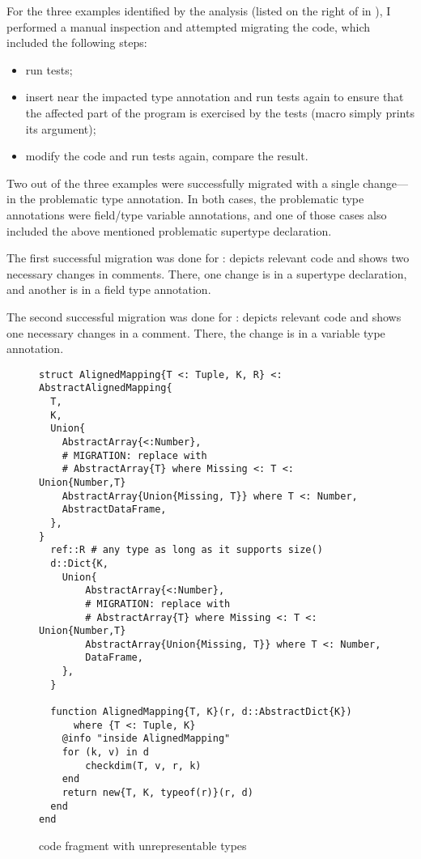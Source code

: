 For the three examples identified by the analysis (listed on the right of
 in ),
I performed a manual inspection and attempted migrating the code,
which included the following steps:
\begin{itemize}
  \item run tests;
  \item insert  near the impacted type annotation and run
    tests again to ensure that the affected part of the program is exercised by
    the tests (macro  simply prints its argument);
  \item modify the code and run tests again, compare the result.
\end{itemize}

Two out of the three examples were successfully migrated with a single
change---in the problematic type annotation.
In both cases, the problematic type annotations were
field/type variable annotations, and one of those cases also included
the above mentioned problematic supertype declaration.

The first successful migration was done for :
 depicts relevant code
and shows two necessary changes in comments.
There, one change is in a supertype declaration, and another
is in a field type annotation.

The second successful migration was done for :
 depicts relevant code
and shows one necessary changes in a comment.
There, the change is in a variable type annotation.

\begin{figure}
\begin{minipage}{12cm}
\begin{lstlisting}
struct AlignedMapping{T <: Tuple, K, R} <: 
AbstractAlignedMapping{
  T,
  K,
  Union{
    AbstractArray{<:Number},
    # MIGRATION: replace with
    # AbstractArray{T} where Missing <: T <: Union{Number,T}
    AbstractArray{Union{Missing, T}} where T <: Number,
    AbstractDataFrame,
  },
}
  ref::R # any type as long as it supports size()
  d::Dict{K,
    Union{
        AbstractArray{<:Number},
        # MIGRATION: replace with
        # AbstractArray{T} where Missing <: T <: Union{Number,T}
        AbstractArray{Union{Missing, T}} where T <: Number,
        DataFrame,
    },
  }
  
  function AlignedMapping{T, K}(r, d::AbstractDict{K}) 
      where {T <: Tuple, K}
    @info "inside AlignedMapping"
    for (k, v) in d
        checkdim(T, v, r, k)
    end
    return new{T, K, typeof(r)}(r, d)
  end
end
\end{lstlisting}
\end{minipage}
\caption{ code fragment with unrepresentable types
}\label{fig:evaluation-migrate-muon}
\end{figure}

